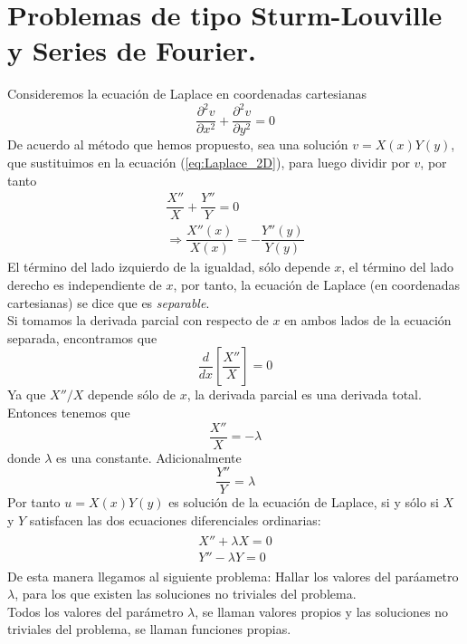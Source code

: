 \section{Problemas de tipo Sturm-Louville y Series de Fourier.}
Consideremos la ecuación de Laplace en coordenadas cartesianas
\begin{equation}
\dfrac{\partial^{2} v}{\partial x^{2}} + \dfrac{\partial^{2} v}{\partial y^{2}} = 0 \label{eq:Laplace_2D}
\end{equation}
De acuerdo al método que hemos propuesto, sea una solución $v = X(x) Y(y)$, que sustituimos en la ecuación  (\ref{eq:Laplace_2D}), para luego dividir por $v$, por tanto
\begin{eqnarray}
\dfrac{X''}{X} + \dfrac{Y''}{Y} = 0 \\
\Rightarrow \dfrac{X''(x)}{X(x)} = - \dfrac{Y''(y)}{Y(y)}
\end{eqnarray}
El término del lado izquierdo de la igualdad, sólo depende $x$, el término del lado derecho es independiente de $x$, por tanto, la ecuación de Laplace (en coordenadas cartesianas) se dice que es \emph{separable}.
\\
Si tomamos la derivada parcial con respecto de $x$ en ambos lados de la ecuación separada, encontramos que
\begin{equation}
\dfrac{d}{dx} \left[ \dfrac{X''}{X} \right] = 0
\end{equation}
Ya que $X''/X$ depende sólo de $x$, la derivada parcial es una derivada total. Entonces tenemos que
\begin{equation}
\dfrac{X''}{X} = - \lambda
\end{equation}
donde $\lambda$ es una constante. Adicionalmente
\begin{equation}
\dfrac{Y''}{Y} = \lambda
\end{equation}
Por tanto $u= X(x) Y(y)$ es solución de la ecuación de Laplace, si y sólo si $X$ y $Y$ satisfacen las dos ecuaciones diferenciales ordinarias:
\begin{eqnarray}
\begin{aligned}
X'' + \lambda X = 0 \\
Y'' - \lambda Y = 0 \label{eq:sistema_separado}
\end{aligned}
\end{eqnarray}
De esta manera llegamos al siguiente problema: Hallar los valores del paráametro $\lambda$, para los que existen las soluciones no triviales del problema.
\\
Todos los valores del parámetro $\lambda$, se llaman valores propios y las soluciones no triviales del problema, se llaman funciones propias.
